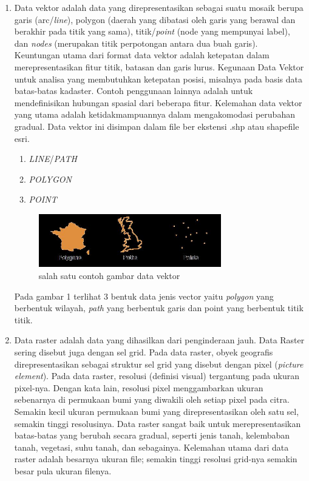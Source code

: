 \begin{enumerate}
\item Data vektor adalah data yang direpresentasikan sebagai suatu mosaik berupa garis (arc/\textit{line}), polygon (daerah yang dibatasi oleh garis yang berawal dan berakhir pada titik yang sama), titik/\textit{point} (node yang mempunyai label), dan \textit{nodes} (merupakan titik perpotongan antara dua buah garis). Keuntungan utama dari format data vektor adalah ketepatan dalam merepresentasikan fitur titik, batasan dan garis lurus. Kegunaan Data Vektor untuk analisa yang membutuhkan ketepatan posisi, misalnya pada basis data batas-batas kadaster. Contoh penggunaan lainnya adalah untuk mendefinisikan hubungan spasial dari beberapa fitur. Kelemahan data vektor yang utama adalah ketidakmampuannya dalam mengakomodasi perubahan gradual. Data vektor ini disimpan dalam file ber ekstensi .shp atau shapefile esri.
	\begin{enumerate}
	\item \textit{LINE}/\textit{PATH}
	\item \textit{POLYGON}
	\item \textit{POINT}
	\end{enumerate}
		\begin{figure}[htbp]
		\centering
		\includegraphics[width=0.75\textwidth]{pictures/datavektor.jpg}
		\caption{salah satu contoh gambar data vektor}
		\label{labelgambar1}
		\end{figure}	
	Pada gambar 1 terlihat 3 bentuk data jenis vector yaitu \textit{polygon} yang berbentuk wilayah, \textit{path} yang berbentuk garis dan point yang berbentuk titik titik.
\item Data raster adalah data yang dihasilkan dari penginderaan jauh. Data Raster sering disebut juga dengan sel grid. Pada data raster, obyek geografis direpresentasikan sebagai struktur sel grid yang disebut dengan pixel (\textit{picture element}). Pada data raster, resolusi (definisi visual) tergantung pada ukuran pixel-nya. Dengan kata lain, resolusi pixel menggambarkan ukuran sebenarnya di permukaan bumi yang diwakili oleh setiap pixel pada citra.
Semakin kecil ukuran permukaan bumi yang direpresentasikan oleh satu sel, semakin tinggi resolusinya. Data raster sangat baik untuk merepresentasikan batas-batas yang berubah secara gradual, seperti jenis tanah, kelembaban tanah, vegetasi, suhu tanah, dan sebagainya. Kelemahan utama dari data raster adalah besarnya ukuran file; semakin tinggi resolusi grid-nya semakin besar pula ukuran filenya.
\end{enumerate}



